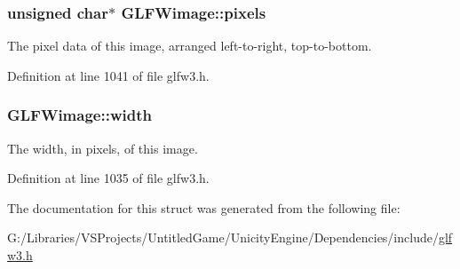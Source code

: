 \hypertarget{struct_g_l_f_wimage_a0c532a5c2bb715555279b7817daba0fb}{}
\subsubsection[{pixels}]{\setlength{\rightskip}{0pt plus 5cm}unsigned char$\ast$ G\+L\+F\+Wimage\+::pixels}\label{struct_g_l_f_wimage_a0c532a5c2bb715555279b7817daba0fb}
The pixel data of this image, arranged left-\/to-\/right, top-\/to-\/bottom. 

Definition at line 1041 of file glfw3.\+h.

\hypertarget{struct_g_l_f_wimage_af6a71cc999fe6d3aea31dd7e9687d835}{}
\subsubsection[{width}]{ G\+L\+F\+Wimage\+::width}\label{struct_g_l_f_wimage_af6a71cc999fe6d3aea31dd7e9687d835}
The width, in pixels, of this image. 

Definition at line 1035 of file glfw3.\+h.



The documentation for this struct was generated from the following file\+:\begin{DoxyCompactItemize}
\item 
G\+:/\+Libraries/\+V\+S\+Projects/\+Untitled\+Game/\+Unicity\+Engine/\+Dependencies/include/\hyperlink{glfw3_8h}{glfw3.\+h}\end{DoxyCompactItemize}
